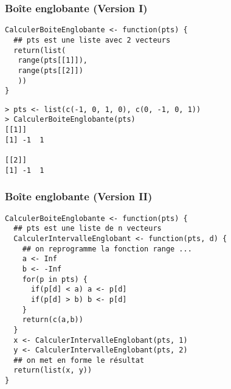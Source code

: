 \documentclass[10pt]{beamer}
\begin{document}
\begin{frame}[fragile]
  \frametitle{Boîte englobante (Version I)}


  \begin{lstlisting}[style=editor]
CalculerBoiteEnglobante <- function(pts) {
  ## pts est une liste avec 2 vecteurs
  return(list(
   range(pts[[1]]),
   range(pts[[2]])
   ))
}
  \end{lstlisting}


  \begin{lstlisting}
> pts <- list(c(-1, 0, 1, 0), c(0, -1, 0, 1))
> CalculerBoiteEnglobante(pts)
[[1]]
[1] -1  1

[[2]]
[1] -1  1
  \end{lstlisting}

\end{frame}


\begin{frame}[fragile]
  \frametitle{Boîte englobante (Version II)}


  \begin{lstlisting}[style=editor]
CalculerBoiteEnglobante <- function(pts) {
  ## pts est une liste de n vecteurs
  CalculerIntervalleEnglobant <- function(pts, d) {
    ## on reprogramme la fonction range ...
    a <- Inf
    b <- -Inf
    for(p in pts) {
      if(p[d] < a) a <- p[d]
      if(p[d] > b) b <- p[d]
    }
    return(c(a,b))
  }
  x <- CalculerIntervalleEnglobant(pts, 1)
  y <- CalculerIntervalleEnglobant(pts, 2)
  ## on met en forme le résultat
  return(list(x, y))
}
  \end{lstlisting}

\end{frame}


\questionSlide

 \appendix
 \backupSlides

\end{document}
